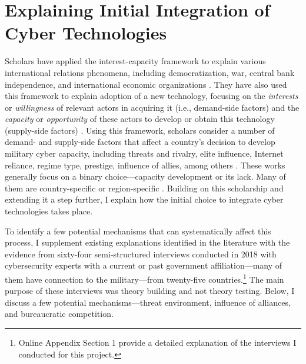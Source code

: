 \documentclass[12pt, letterpaper]{article}
\renewcommand{\baselinestretch}{1.35}
\let\oldfootnote\footnote
\renewcommand\footnote[1]{\oldfootnote{%
		\renewcommand\baselinestretch{.8}%
		\large\footnotesize\ignorespaces#1}} \addtolength{\footnotesep}{3pt}
\theoremstyle{plain}
\theoremstyle{remark}
\begin{document}
 


\section*{Explaining Initial Integration of Cyber Technologies} 

\noindent
Scholars have applied the interest-capacity framework to explain various international relations phenomena, including democratization, war, central bank independence, and international economic organizations \citep{Bodea2015IO, Gleditsch2006IO, Simmons2008IO, siverson1990opportunity}. 
They have also used this framework to explain adoption of a new technology, focusing on the \textit{interests} or \textit{willingness} of relevant actors in acquiring it (i.e., demand-side factors) and the \textit{capacity} or \textit{opportunity} of these actors to develop or obtain this technology (supply-side factors) \citep{most1989logic, jo2007determinants, Fuhrmann2017}. 
Using this framework, scholars consider a number of demand- and supply-side factors that affect a country’s decision to develop military cyber capacity, including threats and rivalry, elite influence, Internet reliance, regime type, prestige, influence of allies, among others \citep{gomez2016arming, brantly2016decision, Calderaro2020}. 
These works generally focus on a binary choice---capacity development or its lack.
Many of them are country-specific \citep{Tabansky2020} or region-specific \citep{brantly2016decision}.
Building on this scholarship and extending it a step further, 
I explain how the initial choice to integrate cyber technologies takes place.
 
To identify a few potential mechanisms that can systematically affect this process, I supplement existing explanations identified in the literature with the evidence from sixty-four semi-structured interviews conducted in 2018 with cybersecurity experts with a current or past government affiliation---many of them have connection to the military---from twenty-five countries.\footnote{
	Online Appendix Section 1 provide a detailed explanation of the interviews I conducted for this project. 
	}
The main purpose of these interviews was theory building and not theory testing. 
Below, I discuss a few potential mechanisms---threat environment, influence of alliances, and bureaucratic competition.
\vspace{3mm}
\end{document}
